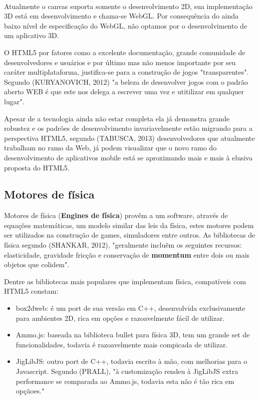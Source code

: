 \documentclass{article}
\begin{document}
\\Atualmente o canvas suporta somente o desenvolvimento 2D, sua implementação 3D está em desenvolvimento e chama-se WebGL. Por consequência do ainda baixo nível de especificação do WebGL, não optamos por o desenvolvimento de um aplicativo 3D.

O HTML5 por fatores como a excelente documentação, grande comunidade de desenvolvedores e usuários e por último mas não menos importante por seu caráter multiplataforma, justifica-se para a construção de jogos "transparentes". Segundo (KURYANOVICH, 2012) "a beleza de desenvolver jogos com o padrão aberto WEB é que este nos delega a escrever uma vez e utitilizar em qualquer lugar".

Apesar de a tecnologia  ainda não estar completa ela já demonstra grande robustez  e os padrões de desenvolvimento invariavelmente estão migrando para a perspectiva HTML5, segundo (TABUSCA, 2013) desenvolvedores que atualmente trabalham no ramo da Web, já podem visualizar que o novo ramo do desenvolvimento de aplicativos mobile está se aproximando mais e mais à elusiva proposta do HTML5.

\subsection{Motores de física}

Motores de física (\textbf{Engines de física}) provêm a um software, através de equações matemáticas, um modelo similar das leis da física, estes motores podem ser utilizados na construção de games, simuladores entre outros. As bibliotecas de física segundo (SHANKAR, 2012), "geralmente incluẽm os seguintes recursos: elasticidade, gravidade fricção e conservação de \textbf{momentum} entre dois ou mais objetos que colidem".

Dentre as bibliotecas mais populares que implementam física, compatíveis com HTML5 constam:

\begin{itemize}
\item box2dweb: é um port de sua versão em C++, desenvolvida exclusivamente para ambientes 2D, rica em opções e razoavelmente fácil de utilizar.
\item Ammo.js: baseada na biblioteca bullet para física 3D, tem um grande set de funcionalidades, todavia é razoavelmente mais compicada de utilizar.

\item JigLibJS: outro port de C++, todavia escrito à mão, com melhorias para o Javascript.  Segundo (PRALL), "à customização rendeu à JigLibJS extra performance se comparada ao Ammo.js, todavia esta não é tão rica em opçãoes."
\end{itemize}
\end{document}

